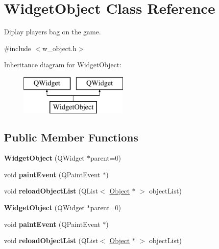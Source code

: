 \hypertarget{class_widget_object}{}\section{Widget\+Object Class Reference}
\label{class_widget_object}


Diplay player\textquotesingle{}s bag on the game.  




{\ttfamily \#include $<$w\+\_\+object.\+h$>$}

Inheritance diagram for Widget\+Object\+:\begin{figure}[H]
\begin{center}
\leavevmode
\includegraphics[height=2.000000cm]{class_widget_object}
\end{center}
\end{figure}
\subsection*{Public Member Functions}
\begin{DoxyCompactItemize}
\item 
\hypertarget{class_widget_object_a9afd6dc40c5f86a62260aab7da90240d}{}{\bfseries Widget\+Object} (Q\+Widget $\ast$parent=0)\label{class_widget_object_a9afd6dc40c5f86a62260aab7da90240d}

\item 
\hypertarget{class_widget_object_a60fa184f747fa815ff6b1604b16dfb01}{}void {\bfseries paint\+Event} (Q\+Paint\+Event $\ast$)\label{class_widget_object_a60fa184f747fa815ff6b1604b16dfb01}

\item 
\hypertarget{class_widget_object_ab94d05b6395226aa5e06a6a551c0ee47}{}void {\bfseries reload\+Object\+List} (Q\+List$<$ \hyperlink{class_object}{Object} $\ast$ $>$ object\+List)\label{class_widget_object_ab94d05b6395226aa5e06a6a551c0ee47}

\item 
\hypertarget{class_widget_object_a9afd6dc40c5f86a62260aab7da90240d}{}{\bfseries Widget\+Object} (Q\+Widget $\ast$parent=0)\label{class_widget_object_a9afd6dc40c5f86a62260aab7da90240d}

\item 
\hypertarget{class_widget_object_a60fa184f747fa815ff6b1604b16dfb01}{}void {\bfseries paint\+Event} (Q\+Paint\+Event $\ast$)\label{class_widget_object_a60fa184f747fa815ff6b1604b16dfb01}

\item 
\hypertarget{class_widget_object_ab94d05b6395226aa5e06a6a551c0ee47}{}void {\bfseries reload\+Object\+List} (Q\+List$<$ \hyperlink{class_object}{Object} $\ast$ $>$ object\+List)\label{class_widget_object_ab94d05b6395226aa5e06a6a551c0ee47}

\end{DoxyCompactItemize}


